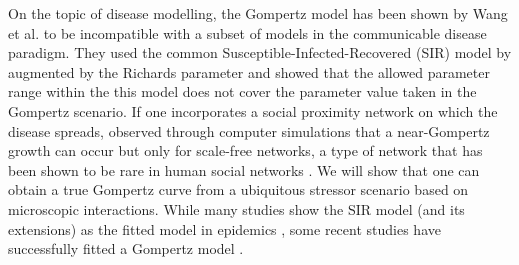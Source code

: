 \documentclass{article}
\begin{document}
On the topic of disease modelling, the Gompertz model has been shown by Wang et al. \cite{wang2012richards} to be incompatible with a subset of models in the communicable disease paradigm. They used the common Susceptible-Infected-Recovered (SIR) model by \citet{kermack1927contribution} augmented by the Richards parameter and showed that the allowed parameter range within the this model does not cover the parameter value taken in the Gompertz scenario. If one incorporates a social proximity network on which the disease spreads, \citet{zonta2022virus} observed through computer simulations that a near-Gompertz growth can occur but only for scale-free networks, a type of network that has been shown to be rare in human social networks \cite{clauset2009power,broido2019scale,holme2019rare}. 
We will show that one can obtain a true Gompertz curve from a ubiquitous stressor scenario based on microscopic interactions.
While many studies show the SIR model (and its extensions) as the fitted model in epidemics \cite{carletti2020covid,cooper2020sir,postnikov2020estimation,munoz2021sir,cooper2022dynamical,saikia2021covid}, some recent studies have successfully fitted a Gompertz model \cite{Ohnishi2020,Rypdal2020,Catala2020,rodrigues2020monte,Levitt2020}.
\end{document}
